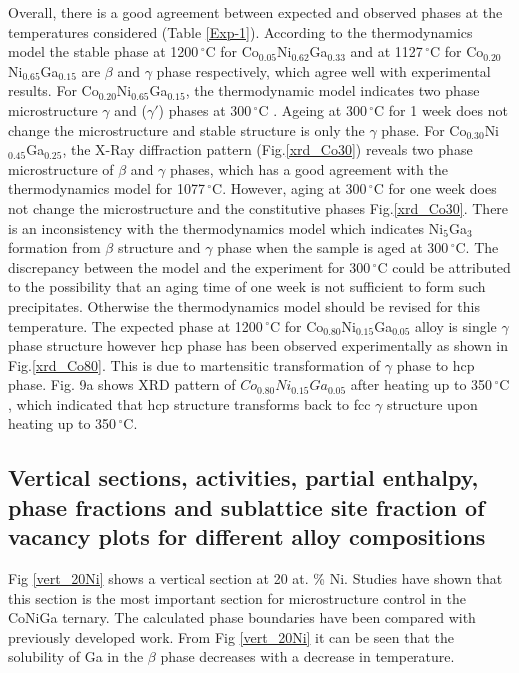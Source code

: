 \documentclass[article]{elsarticle}
\begin{document}
Overall, there is a good agreement between expected and observed phases at the temperatures considered (Table \ref{Exp-1}).
According to the thermodynamics model the stable phase at 1200$\,^{\circ}\mathrm{C}$ for Co$_{0.05}$Ni$_{0.62}$Ga$_{0.33}$
and at 1127$\,^{\circ}\mathrm{C}$ for Co$_{0.20}$Ni$_{0.65}$Ga$_{0.15}$ are $\beta$ and $\gamma$ phase respectively,
which agree well with experimental results. For Co$_{0.20}$Ni$_{0.65}$Ga$_{0.15}$, the thermodynamic
model indicates two phase microstructure $\gamma$ and ($\gamma'$) phases at 300$\,^{\circ}\mathrm{C}$ .
Ageing at 300$\,^{\circ}\mathrm{C}$ for 1 week does not change the microstructure and stable structure
is only  the $\gamma$ phase. For Co$_{0.30}$Ni$_{0.45}$Ga$_{0.25}$, the X-Ray diffraction pattern (Fig.\ref{xrd_Co30}) reveals
two phase microstructure of $\beta$ and $\gamma$ phases, which has a good agreement with the thermodynamics model
for 1077$\,^{\circ}\mathrm{C}$. However, aging at 300$\,^{\circ}\mathrm{C}$ for one week does not change the microstructure
and the constitutive phases Fig.\ref{xrd_Co30}. There is an inconsistency with the thermodynamics model which indicates
Ni$_{5}$Ga$_{3}$ formation from $\beta$ structure and $\gamma$ phase when the sample is aged at 300$\,^{\circ}\mathrm{C}$.
The discrepancy between the model and the experiment for 300$\,^{\circ}\mathrm{C}$ could be attributed to the possibility that an aging time of 
 one week is not sufficient to form such precipitates. Otherwise the thermodynamics model should be
revised for this temperature. The expected phase at 1200$\,^{\circ}\mathrm{C}$
for Co$_{0.80}$Ni$_{0.15}$Ga$_{0.05}$ alloy is single $\gamma$ phase structure
however hcp phase has been observed experimentally as shown in Fig.\ref{xrd_Co80}. This is due to martensitic transformation of $\gamma$ phase to hcp phase. Fig. 9a shows XRD pattern of  $Co_{0.80}Ni_{0.15}Ga_{0.05}$ after heating up to 350$\,^{\circ}\mathrm{C}$, which indicated that hcp structure transforms back to fcc $\gamma$ structure upon heating up to 350$\,^{\circ}\mathrm{C}$. 

\subsection{Vertical sections, activities, partial enthalpy, phase fractions
and sublattice site fraction of vacancy plots for different alloy compositions}
Fig \ref{vert_20Ni} shows a vertical section at 20 at. \% Ni. Studies
\cite{Duch08,Oik01} have shown that this section is the most important
section for microstructure control in the CoNiGa ternary. The calculated
phase boundaries have been compared with previously developed work. From Fig \ref{vert_20Ni} 
it can be seen that the solubility of Ga in the $\beta$ phase decreases with a decrease in temperature.
\end{document}
